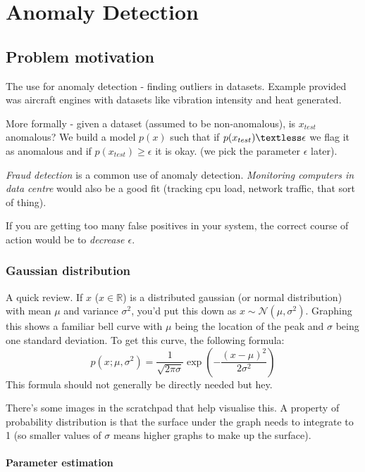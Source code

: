 \chapter{Anomaly Detection}
\section{Problem motivation}

The use for anomaly detection - finding outliers in datasets. Example provided was aircraft engines with datasets like vibration intensity and heat generated.

More formally - given a dataset (assumed to be non-anomalous), is $x_{test}$ anomalous? We build a model $p(x)$ such that if $p(x_{test}) \textless \epsilon$ we flag it as anomalous and if $p(x_{test}) \geq \epsilon$ it is okay. (we pick the parameter $\epsilon$ later).

\emph{Fraud detection} is a common use of anomaly detection. \emph{Monitoring computers in data centre} would also be a good fit (tracking cpu load, network traffic, that sort of thing).

If you are getting too many false positives in your system, the correct course of action would be to \emph{decrease $\epsilon$}.

\subsection{Gaussian distribution}

A quick review. If $x$ ($x \in \mathbb{R}$) is a distributed gaussian (or normal distribution) with mean $\mu$ and variance $\sigma^2$, you'd put this down as $x \sim \mathcal{N}(\mu, \sigma^2)$. Graphing this shows a familiar bell curve with $\mu$ being the location of the peak and $\sigma$ being one standard deviation. To get this curve, the following formula:
\begin{equation}
p(x;\mu, \sigma^2) = \frac{1}{\sqrt{2\pi\sigma}}
\exp\left({-\frac{(x - \mu)^2}{2\sigma^2}}\right)
\end{equation}
This formula should not generally be directly needed but hey.

There's some images in the scratchpad that help visualise this. A property of probability distribution is that the surface under the graph needs to integrate to 1 (so smaller values of $\sigma$ means higher graphs to make up the surface).

\subsubsection{Parameter estimation}

